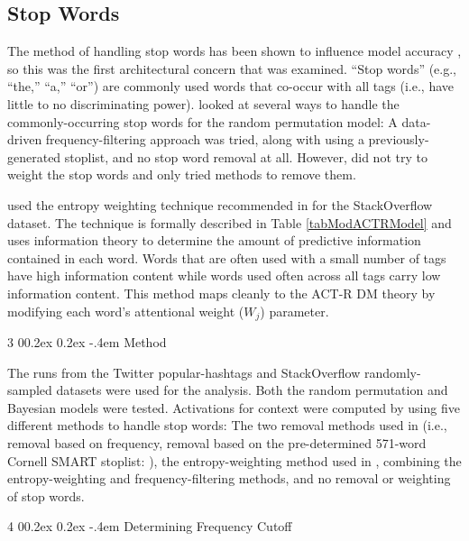 \documentclass[man,floatsintext,donotrepeattitle]{apa6}
\makeatletter
\renewcommand{\subsubsection}{%
  \@startsection
  {subsubsection}%
  {3}%
  {\parindent}%
  {0\baselineskip \@plus 0.2ex \@minus 0.2ex}%
  {-.4em}%
  {\normalfont\normalsize\bfseries\addperi}}
\renewcommand{\paragraph}{%
  \@startsection
  {paragraph}%
  {4}%
  {\parindent}%
  {0\baselineskip \@plus 0.2ex \@minus 0.2ex}%
  {-.4em}%
  {\normalfont\normalsize\bfseries\itshape\addperi}}
\makeatother
\begin{document}
\subsection{Stop Words}

The method of handling stop words has been shown to influence model accuracy \parencite{Sahlgren2008,Stanley2013,Jones2007}, so this was the first architectural concern that was examined.
``Stop words'' (e.g., ``the,'' ``a,'' ``or'') are commonly used words that co-occur with all tags (i.e., have little to no discriminating power).
\textcite{Sahlgren2008} looked at several ways to handle the commonly-occurring stop words for the random permutation model:
A data-driven frequency-filtering approach was tried, along with using a previously-generated stoplist, and no stop word removal at all.
However, \citeauthor{Sahlgren2008} did not try to weight the stop words and only tried methods to remove them.

\textcite{Stanley2013} used the entropy weighting technique recommended in \textcite{Dumais1991} for the StackOverflow dataset.
The technique is formally described in Table \ref{tabModACTRModel} and uses information theory to determine the amount of predictive information contained in each word.
Words that are often used with a small number of tags have high information content while words used often across all tags carry low information content.
This method maps cleanly to the ACT-R DM theory by modifying each word's attentional weight ($W_{j}$) parameter.

\subsubsection{Method}

The runs from the Twitter popular-hashtags and StackOverflow randomly-sampled datasets were used for the analysis.
Both the random permutation and Bayesian models were tested.
Activations for context were computed by using five different methods to handle stop words:
The two removal methods used in \textcite{Sahlgren2008}
(i.e., removal based on frequency, removal based on the pre-determined 571-word Cornell SMART stoplist: \textcite{Salton1988}),
the entropy-weighting method used in \textcite{Stanley2013},
combining the entropy-weighting and frequency-filtering methods,
and no removal or weighting of stop words.

\paragraph{Determining Frequency Cutoff}
\end{document}
